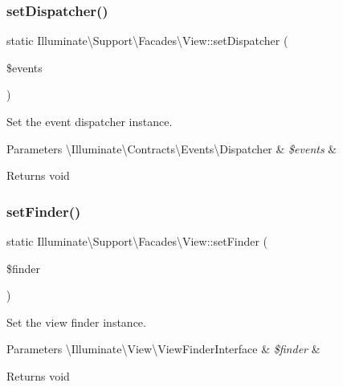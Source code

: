 \subsubsection{\texorpdfstring{set\+Dispatcher()}{setDispatcher()}}
{\footnotesize\ttfamily static Illuminate\textbackslash{}\+Support\textbackslash{}\+Facades\textbackslash{}\+View\+::set\+Dispatcher (\begin{DoxyParamCaption}\item[{}]{\$events }\end{DoxyParamCaption})\hspace{0.3cm}{\ttfamily [static]}}

Set the event dispatcher instance.


\begin{DoxyParams}[1]{Parameters}
\textbackslash{}\+Illuminate\textbackslash{}\+Contracts\textbackslash{}\+Events\textbackslash{}\+Dispatcher & {\em \$events} & \\
\hline
\end{DoxyParams}
\begin{DoxyReturn}{Returns}
void 
\end{DoxyReturn}
\mbox{\label{class_illuminate_1_1_support_1_1_facades_1_1_view_af4edf9aacb36a505652d79806dabc5be}} 
\subsubsection{\texorpdfstring{set\+Finder()}{setFinder()}}
{\footnotesize\ttfamily static Illuminate\textbackslash{}\+Support\textbackslash{}\+Facades\textbackslash{}\+View\+::set\+Finder (\begin{DoxyParamCaption}\item[{}]{\$finder }\end{DoxyParamCaption})\hspace{0.3cm}{\ttfamily [static]}}

Set the view finder instance.


\begin{DoxyParams}[1]{Parameters}
\textbackslash{}\+Illuminate\textbackslash{}\+View\textbackslash{}\+View\+Finder\+Interface & {\em \$finder} & \\
\hline
\end{DoxyParams}
\begin{DoxyReturn}{Returns}
void 
\end{DoxyReturn}
\mbox{\label{class_illuminate_1_1_support_1_1_facades_1_1_view_a3e3fa64ea9e47ce8eb08db3838dd2af7}} 
